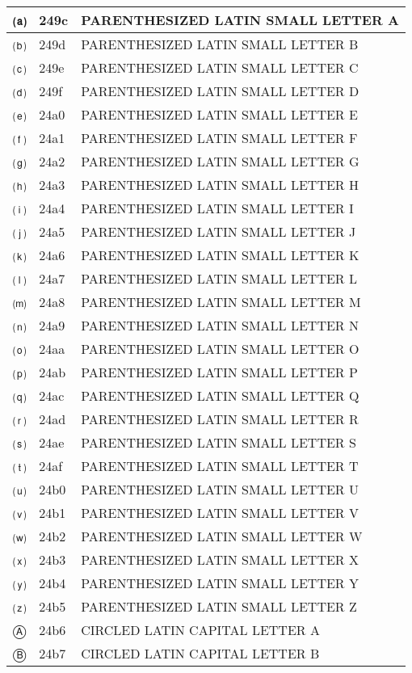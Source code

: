 \documentclass[12pt,letterpaper,openany]{book}
\begin{document}
\begin{center}
\begin{supertabular}{|m{0.25in}|m{0.5in}|m{4in}|}
⒜ & 249c & PARENTHESIZED LATIN SMALL LETTER A\\\hline
⒝ & 249d & PARENTHESIZED LATIN SMALL LETTER B\\\hline
⒞ & 249e & PARENTHESIZED LATIN SMALL LETTER C\\\hline
⒟ & 249f & PARENTHESIZED LATIN SMALL LETTER D\\\hline
⒠ & 24a0 & PARENTHESIZED LATIN SMALL LETTER E\\\hline
⒡ & 24a1 & PARENTHESIZED LATIN SMALL LETTER F\\\hline
⒢ & 24a2 & PARENTHESIZED LATIN SMALL LETTER G\\\hline
⒣ & 24a3 & PARENTHESIZED LATIN SMALL LETTER H\\\hline
⒤ & 24a4 & PARENTHESIZED LATIN SMALL LETTER I\\\hline
⒥ & 24a5 & PARENTHESIZED LATIN SMALL LETTER J\\\hline
⒦ & 24a6 & PARENTHESIZED LATIN SMALL LETTER K\\\hline
⒧ & 24a7 & PARENTHESIZED LATIN SMALL LETTER L\\\hline
⒨ & 24a8 & PARENTHESIZED LATIN SMALL LETTER M\\\hline
⒩ & 24a9 & PARENTHESIZED LATIN SMALL LETTER N\\\hline
⒪ & 24aa & PARENTHESIZED LATIN SMALL LETTER O\\\hline
⒫ & 24ab & PARENTHESIZED LATIN SMALL LETTER P\\\hline
⒬ & 24ac & PARENTHESIZED LATIN SMALL LETTER Q\\\hline
⒭ & 24ad & PARENTHESIZED LATIN SMALL LETTER R\\\hline
⒮ & 24ae & PARENTHESIZED LATIN SMALL LETTER S\\\hline
⒯ & 24af & PARENTHESIZED LATIN SMALL LETTER T\\\hline
⒰ & 24b0 & PARENTHESIZED LATIN SMALL LETTER U\\\hline
⒱ & 24b1 & PARENTHESIZED LATIN SMALL LETTER V\\\hline
⒲ & 24b2 & PARENTHESIZED LATIN SMALL LETTER W\\\hline
⒳ & 24b3 & PARENTHESIZED LATIN SMALL LETTER X\\\hline
⒴ & 24b4 & PARENTHESIZED LATIN SMALL LETTER Y\\\hline
⒵ & 24b5 & PARENTHESIZED LATIN SMALL LETTER Z\\\hline
Ⓐ & 24b6 & CIRCLED LATIN CAPITAL LETTER A\\\hline
Ⓑ & 24b7 & CIRCLED LATIN CAPITAL LETTER B\\\hline

\end{supertabular}
\end{center}
\end{document}
